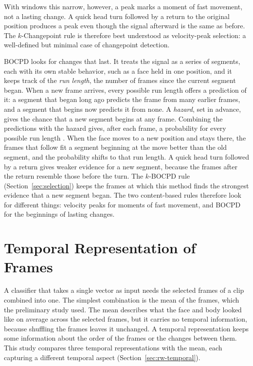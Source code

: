 With windows this narrow, however, a peak marks a moment of fast movement, not a lasting change. A quick head turn followed by a return to the original position produces a peak even though the signal afterward is the same as before. The $k$-Changepoint rule is therefore best understood as velocity-peak selection: a well-defined but minimal case of changepoint detection.

BOCPD looks for changes that last. It treats the signal as a series of segments, each with its own stable behavior, such as a face held in one position, and it keeps track of the \emph{run length}, the number of frames since the current segment began. When a new frame arrives, every possible run length offers a prediction of it: a segment that began long ago predicts the frame from many earlier frames, and a segment that begins now predicts it from none. A \emph{hazard}, set in advance, gives the chance that a new segment begins at any frame. Combining the predictions with the hazard gives, after each frame, a probability for every possible run length \cite{adams2007}. When the face moves to a new position and stays there, the frames that follow fit a segment beginning at the move better than the old segment, and the probability shifts to that run length. A quick head turn followed by a return gives weaker evidence for a new segment, because the frames after the return resemble those before the turn. The $k$-BOCPD rule (Section~\ref{sec:selection}) keeps the frames at which this method finds the strongest evidence that a new segment began. The two content-based rules therefore look for different things: velocity peaks for moments of fast movement, and BOCPD for the beginnings of lasting changes.



\section{Temporal Representation of Frames}
\label{sec:temporal}

A classifier that takes a single vector as input needs the selected frames of a clip combined into one. The simplest combination is the mean of the frames, which the preliminary study used. The mean describes what the face and body looked like on average across the selected frames, but it carries no temporal information, because shuffling the frames leaves it unchanged. A temporal representation keeps some information about the order of the frames or the changes between them. This study compares three temporal representations with the mean, each capturing a different temporal aspect (Section~\ref{sec:rw-temporal}).

